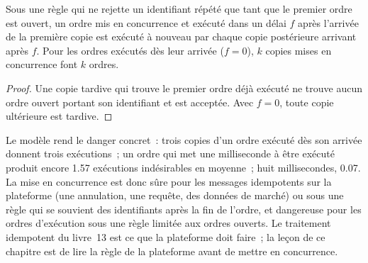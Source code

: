 \begin{omfigure}

\label{fig:nw:cross-region-crypto-networks:dups}
\end{omfigure}

\begin{proposition}\label{prop:nw:cross-region-crypto-networks:dup}
Sous une règle qui ne rejette un identifiant répété que tant que le premier ordre est ouvert, un ordre mis en concurrence et exécuté dans un délai $f$ après
l'arrivée de la première copie est exécuté à nouveau par chaque copie postérieure arrivant après $f$. Pour les ordres exécutés dès leur arrivée ($f = 0$), $k$ copies mises en concurrence font $k$ ordres.
\end{proposition}

\begin{proof}
Une copie tardive qui trouve le premier ordre déjà exécuté ne trouve aucun ordre ouvert portant son identifiant et est acceptée. Avec $f = 0$, toute copie ultérieure est tardive.
\end{proof}

Le modèle rend le danger concret~: trois copies d'un ordre exécuté dès son arrivée donnent trois exécutions~; un ordre qui met une milliseconde à être exécuté produit
encore 1.57 exécutions indésirables en moyenne~; huit millisecondes, 0.07. La mise en concurrence est donc sûre pour les messages idempotents
sur la plateforme (une annulation, une requête, des données de marché) ou sous une règle qui se souvient des identifiants après la fin de l'ordre, et dangereuse pour les ordres d'exécution sous une
règle limitée aux ordres ouverts. Le traitement idempotent du livre~13 est ce que la plateforme doit faire~; la leçon de ce chapitre est de lire la règle de la plateforme avant de mettre en concurrence.

